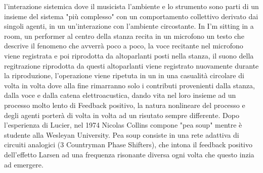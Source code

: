 l'interazione sistemica dove il musicista l'ambiente e lo strumento sono parti di un insieme del sistema "più complesso" con un comportamento collettivo derivato dai singoli agenti,
in un un'interazione con l'ambiente circostante.
In I'm sitting in a room, un performer al centro della stanza
recita in un microfono un testo che descrive il fenomeno che avverrà poco a poco,
la voce recitante nel microfono viene registrata e poi riprodotta da altoparlanti
posti nella stanza, il suono della regitrazione riprodotta da questi altoparlanti
viene registrato nuovamente durante la riproduzione, l'operazione
viene ripetuta in un in una casualità circolare di volta in volta dove alla fine rimarranno
solo i contributi provenienti dalla stanza, dalla voce e dalla catena elettroacustica,
dando vita nel loro insieme ad un processo molto lento di Feedback positivo,
la natura nonlineare del processo e degli agenti porterà di volta in volta ad un risutato
sempre differente.
Dopo l'esperienza di Lucier, nel 1974 Nicolas Collins compone "pea soup"
mentre è studente alla Wesleyan University.
Pea soup consiste in una rete adattiva di circuiti analogici (3 Countryman Phase Shifters),
che intona il feedback positivo dell'effetto Larsen ad una frequenza risonante diversa
ogni volta che questo inzia ad emergere.


